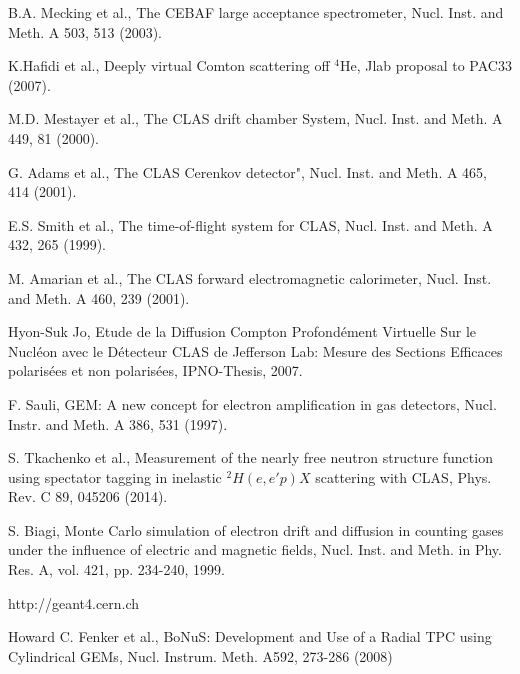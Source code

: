 \documentclass[twocolumn,showpacs,superscriptaddress,groupedaddress]{revtex4}
\begin{document}
\begin{thebibliography}{99}

   B.A. Mecking et al., The CEBAF large acceptance spectrometer, Nucl. Inst. 
   and Meth. A 503, 513 (2003).

   K.Hafidi et al., Deeply virtual Comton scattering off $^{4}$He, Jlab 
   proposal to PAC33 (2007).

   M.D. Mestayer et al., The CLAS drift chamber System, Nucl. Inst.  and Meth.  
   A 449, 81 (2000).

   G. Adams et al., The CLAS Cerenkov detector", Nucl. Inst. and Meth. A 465, 
   414 (2001).

   E.S. Smith et al., The time-of-flight system for CLAS, Nucl.  Inst. and 
   Meth. A 432, 265 (1999).

   M. Amarian et al., The CLAS forward electromagnetic calorimeter, Nucl.  
   Inst. and Meth. A 460, 239 (2001). 

   Hyon-Suk Jo, Etude de la Diffusion Compton Profond{\'e}ment Virtuelle Sur le 
   Nucl{\'e}on avec le D{\'e}tecteur CLAS de Jefferson Lab: Mesure des Sections 
   Efficaces polaris{\'e}es et non polaris{\'e}es, IPNO-Thesis, 2007.

   F. Sauli, GEM: A new concept for electron amplification in gas detectors, 
   Nucl. Instr. and Meth. A 386, 531 (1997).

   S. Tkachenko et al., Measurement of the nearly free neutron structure 
   function using spectator tagging in inelastic $^{2}H(e,e'p)X$ scattering 
   with CLAS,	Phys. Rev. C 89, 045206 (2014).

   S. Biagi, Monte Carlo simulation of electron drift and diffusion in counting 
   gases under the influence of electric and magnetic fields, Nucl.  Inst. and 
   Meth. in Phy. Res. A, vol. 421, pp. 234-240, 1999.

http://geant4.cern.ch
 	
Howard C. Fenker et al., BoNuS: Development and Use of a Radial TPC using Cylindrical GEMs, Nucl. Instrum. Meth. A592, 273-286 (2008)
\end{thebibliography}
\end{document}
